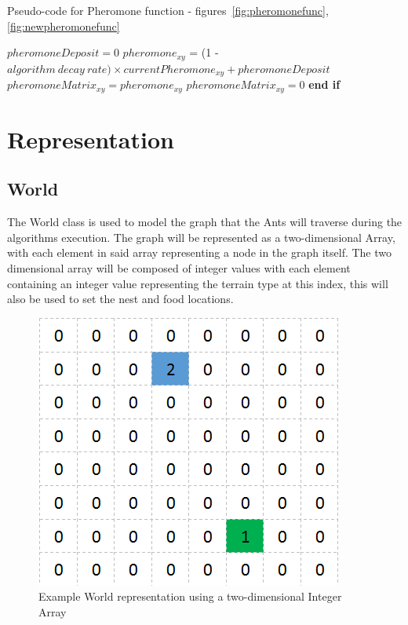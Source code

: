 \begin{algorithm}[H]
\caption[Pheromone Function Pseudo-code]{Pseudo-code for Pheromone function - figures~\ref{fig:pheromonefunc}, \ref{fig:newpheromonefunc}}
\label{aco:pseudo:pherofunc}
\begin{algorithmic}[1]
\State $pheromoneDeposit = 0$
\EndIf
\State $pheromone_{xy}$ = (1 - $algorithm\ decay\ rate) \times currentPheromone_{xy} + pheromoneDeposit$
\State $pheromoneMatrix_{xy} = pheromone_{xy}$
\Else
\State $pheromoneMatrix_{xy} = 0$
\EndIf \State \textbf{end if}
\end{algorithmic}
\end{algorithm}

\section{Representation}
\subsection{World}
\label{sec:world}
The World class is used to model the graph that the Ants will traverse during the algorithms execution. The graph will be represented as a two-dimensional Array, with each element in said array representing a node in the graph itself. The two dimensional array will be composed of integer values with each element containing an integer value representing the terrain type at this index, this will also be used to set the nest and food locations. 

\begin{figure}[H]
\centering
\includegraphics[scale=0.8]{Images/design/graph}
\caption[Example World Representation]{Example World representation using a two-dimensional Integer Array}
\label{fig:graph}
\end{figure}

